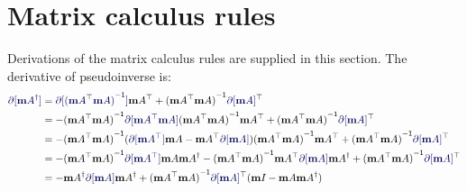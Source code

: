 \documentclass[runningheads]{llncs}
\def\eqlabel#1{\label{eq:#1}}
\def\tr{^\top}
\begin{document}
\section{Matrix calculus rules}
\label{sec:mxcalc}
Derivations of the matrix calculus rules are supplied in this section.   The derivative of pseudoinverse is:
\begin{align*}
\diff[\pinv \mA] 
&= \diff[\inv{(\mA\tr\mA)}]\mA\tr + \inv{(\mA\tr\mA)}\diff[\mA]\tr
\\& = - \inv{(\mA\tr\mA)}\diff[\mA\tr\mA]\inv{(\mA\tr\mA)}\mA\tr + \inv{(\mA\tr\mA)}\diff[\mA]\tr
\\& = - \inv{(\mA\tr\mA)}(\diff[\mA\tr]\mA - \mA\tr\diff[\mA])\inv{(\mA\tr\mA)}\mA\tr + \inv{(\mA\tr\mA)}\diff[\mA]\tr
\\& = - \inv{(\mA\tr\mA)}\diff[\mA\tr]\mA\pinv{\mA} - \inv{(\mA\tr\mA)}\mA\tr\diff[\mA]\pinv{\mA} +
 \inv{(\mA\tr\mA)}\diff[\mA]\tr
\\& = -\pinv \mA \diff[\mA] \pinv \mA +
\inv{(\mA\tr\mA)}\diff[\mA]\tr(\Id{}-\mA\pinv\mA)
\eqlabel{diffpinv}
\end{align*}
\end{document}
